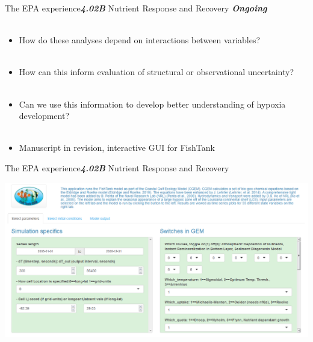 \documentclass[serif]{beamer}\usepackage[]{graphicx}\usepackage[]{color}
\newcommand{\emtxt}[1]{\textbf{\textit{#1}}}
\begin{document}
\begin{frame}{The EPA experience}{\emtxt{4.02B} Nutrient Response and Recovery}
\emtxt{Ongoing}\\~\\
\begin{itemize}
\item How do these analyses depend on interactions between variables? \\~\\
\item How can this inform evaluation of structural or observational uncertainty? \\~\\
\item Can we use this information to develop better understanding of hypoxia development? \\~\\
\item Manuscript in revision, interactive GUI for FishTank
\end{itemize}
\end{frame}

\begin{frame}{The EPA experience}{\emtxt{4.02B} Nutrient Response and Recovery}
\centerline{\includegraphics[width = 1.05\textwidth]{fig/fishtank_gui.png}}
\end{frame}
\end{document}
